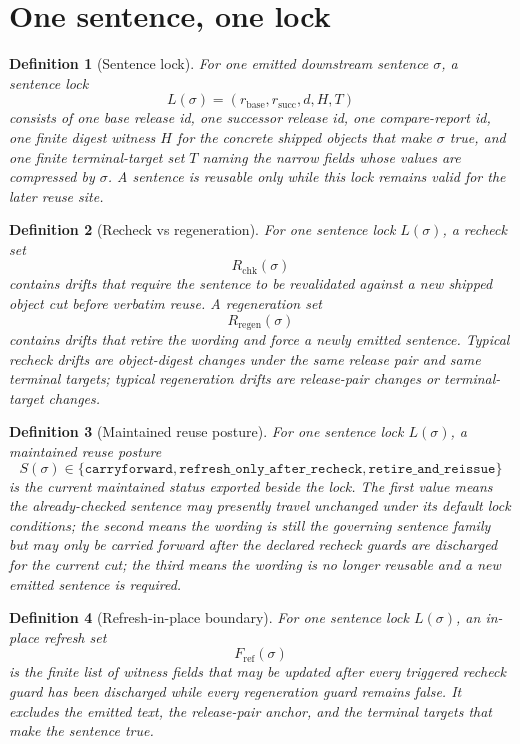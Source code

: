 \documentclass[11pt]{article}
\newtheorem{definition}{Definition}
\begin{document}
\section{One sentence, one lock}

\begin{definition}[Sentence lock]
For one emitted downstream sentence $\sigma$, a \emph{sentence lock}
\[
L(\sigma)=(r_{\mathrm{base}},r_{\mathrm{succ}},d,H,T)
\]
consists of one base release id, one successor release id, one compare-report id, one finite digest witness $H$ for the concrete shipped objects that make $\sigma$ true, and one finite terminal-target set $T$ naming the narrow fields whose values are compressed by $\sigma$.
A sentence is reusable only while this lock remains valid for the later reuse site.
\end{definition}

\begin{definition}[Recheck vs regeneration]
For one sentence lock $L(\sigma)$, a \emph{recheck set}
\[
R_{\mathrm{chk}}(\sigma)
\]
contains drifts that require the sentence to be revalidated against a new shipped object cut before verbatim reuse.
A \emph{regeneration set}
\[
R_{\mathrm{regen}}(\sigma)
\]
contains drifts that retire the wording and force a newly emitted sentence.
Typical recheck drifts are object-digest changes under the same release pair and same terminal targets; typical regeneration drifts are release-pair changes or terminal-target changes.
\end{definition}

\begin{definition}[Maintained reuse posture]
For one sentence lock $L(\sigma)$, a \emph{maintained reuse posture}
\[
S(\sigma)\in\{\texttt{carryforward},\texttt{refresh\_only\_after\_recheck},\texttt{retire\_and\_reissue}\}
\]
is the current maintained status exported beside the lock. The first value means the already-checked sentence may presently travel unchanged under its default lock conditions; the second means the wording is still the governing sentence family but may only be carried forward after the declared recheck guards are discharged for the current cut; the third means the wording is no longer reusable and a new emitted sentence is required.
\end{definition}

\begin{definition}[Refresh-in-place boundary]
For one sentence lock $L(\sigma)$, an \emph{in-place refresh set}
\[
F_{\mathrm{ref}}(\sigma)
\]
is the finite list of witness fields that may be updated after every triggered recheck guard has been discharged while every regeneration guard remains false.
It excludes the emitted text, the release-pair anchor, and the terminal targets that make the sentence true.
\end{definition}
\end{document}
